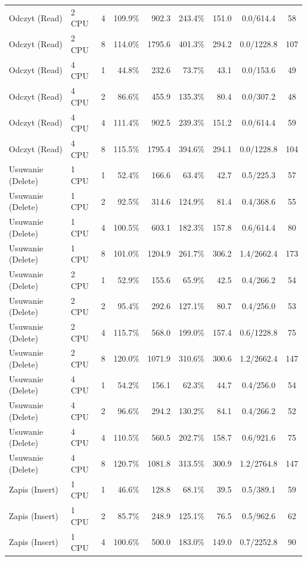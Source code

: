 \begin{table}[ht]
{\begin{tabular}{llcrrrrcc}
Odczyt (Read) & 2 CPU & 4 & 109.9\% & 902.3 & 243.4\% & 151.0 & 0.0/614.4 & 58 \\
Odczyt (Read) & 2 CPU & 8 & 114.0\% & 1795.6 & 401.3\% & 294.2 & 0.0/1228.8 & 107 \\
Odczyt (Read) & 4 CPU & 1 & 44.8\% & 232.6 & 73.7\% & 43.1 & 0.0/153.6 & 49 \\
Odczyt (Read) & 4 CPU & 2 & 86.6\% & 455.9 & 135.3\% & 80.4 & 0.0/307.2 & 48 \\
Odczyt (Read) & 4 CPU & 4 & 111.4\% & 902.5 & 239.3\% & 151.2 & 0.0/614.4 & 59 \\
Odczyt (Read) & 4 CPU & 8 & 115.5\% & 1795.4 & 394.6\% & 294.1 & 0.0/1228.8 & 104 \\
Usuwanie (Delete) & 1 CPU & 1 & 52.4\% & 166.6 & 63.4\% & 42.7 & 0.5/225.3 & 57 \\
Usuwanie (Delete) & 1 CPU & 2 & 92.5\% & 314.6 & 124.9\% & 81.4 & 0.4/368.6 & 55 \\
Usuwanie (Delete) & 1 CPU & 4 & 100.5\% & 603.1 & 182.3\% & 157.8 & 0.6/614.4 & 80 \\
Usuwanie (Delete) & 1 CPU & 8 & 101.0\% & 1204.9 & 261.7\% & 306.2 & 1.4/2662.4 & 173 \\
Usuwanie (Delete) & 2 CPU & 1 & 52.9\% & 155.6 & 65.9\% & 42.5 & 0.4/266.2 & 54 \\
Usuwanie (Delete) & 2 CPU & 2 & 95.4\% & 292.6 & 127.1\% & 80.7 & 0.4/256.0 & 53 \\
Usuwanie (Delete) & 2 CPU & 4 & 115.7\% & 568.0 & 199.0\% & 157.4 & 0.6/1228.8 & 75 \\
Usuwanie (Delete) & 2 CPU & 8 & 120.0\% & 1071.9 & 310.6\% & 300.6 & 1.2/2662.4 & 147 \\
Usuwanie (Delete) & 4 CPU & 1 & 54.2\% & 156.1 & 62.3\% & 44.7 & 0.4/256.0 & 54 \\
Usuwanie (Delete) & 4 CPU & 2 & 96.6\% & 294.2 & 130.2\% & 84.1 & 0.4/266.2 & 52 \\
Usuwanie (Delete) & 4 CPU & 4 & 110.5\% & 560.5 & 202.7\% & 158.7 & 0.6/921.6 & 75 \\
Usuwanie (Delete) & 4 CPU & 8 & 120.7\% & 1081.8 & 313.5\% & 300.9 & 1.2/2764.8 & 147 \\
Zapis (Insert) & 1 CPU & 1 & 46.6\% & 128.8 & 68.1\% & 39.5 & 0.5/389.1 & 59 \\
Zapis (Insert) & 1 CPU & 2 & 85.7\% & 248.9 & 125.1\% & 76.5 & 0.5/962.6 & 62 \\
Zapis (Insert) & 1 CPU & 4 & 100.6\% & 500.0 & 183.0\% & 149.0 & 0.7/2252.8 & 90 \\

\end{tabular}}
\end{table}
